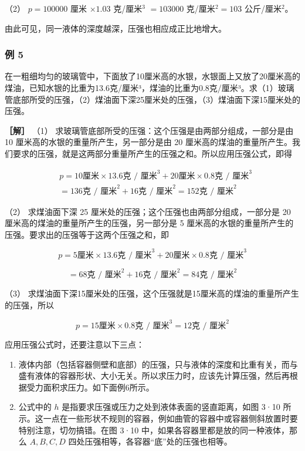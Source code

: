 （2） \(p = 100000\) 厘米 \(\times 1.03\) 克/厘米\(^3\) \(= 103000\)
克/厘米\(^2 = 103\) 公斤/厘米\(^2\)。

由此可见，同一液体的深度越深，压强也相应成正比地增大。

\subsubsection{例 5}\label{ux4f8b-5}

在一粗细均匀的玻璃管中，下面放了10厘米高的水银，水银面上又放了20厘米高的煤油，已知水银的比重为13.6克/厘米³，煤油的比重为0.8克/厘米³。求（1）玻璃管底部所受的压强，（2）煤油面下深25厘米处的压强，（3）煤油面下深15厘米处的压强。

\textbf{［解］} （1）
求玻璃管底部所受的压强：这个压强是由两部分组成，一部分是由 10
厘米高的水银的重量所产生，另一部分是由 20
厘米高的煤油的重量所产生。我们要求的压强，就是这两部分重量所产生的压强之和。所以应用压强公式，即得

\[
\begin{array}{rl} & p = 10 \text{厘米} \times 13.6 \text{克 / 厘米} ^ {3} + 20 \text{厘米} \times 0.8 \text{克 / 厘米} ^ {3} \\ & = 136 \text{克 / 厘米} ^ {2} + 16 \text{克 / 厘米} ^ {2} = 152 \text{克 / 厘米} ^ {2} \end{array}
\]

（2） 求煤油面下深 25 厘米处的压强；这个压强也由两部分组成，一部分是 20
厘米高的煤油的重量所产生的压强，另一部分是 5
厘米高的水银的重量所产生的压强。要求出的压强等于这两个压强之和，即

\[
p = 5 \text{厘米} \times 13.6 \text{克 / 厘米} ^ {3} + 20 \text{厘米} \times 0.8 \text{克 / 厘米} ^ {3}
\]

\[
= 68 \text{克 / 厘米} ^ {2} + 16 \text{克 / 厘米} ^ {2} = 84 \text{克 / 厘米} ^ {2}
\]

（3）
求煤油面下深15厘米处的压强，这个压强就是15厘米高的煤油的重量所产生的压强，所以

\[
p = 15 \text{厘米} \times 0.8 \text{克 / 厘米} ^ {3} = 12 \text{克 / 厘米} ^ {2}
\]

应用压强公式时，还要注意以下三点：

\begin{enumerate}
\def\labelenumi{\arabic{enumi}.}
\item
  液体内部（包括容器侧壁和底部）的压强，只与液体的深度和比重有关，而与盛有液体的容器形状、大小无关。所以求压力时，应该先计算压强，然后再根据受力面积求压力。如下面例6所示。
\item
  公式中的 \(h\) 是指要求压强或压力之处到液体表面的竖直距离，如图 3·10
  所示。这一点在一些形状不规则的容器，例如曲管的容器中或容器侧斜放置时要特别注意，切勿搞错。在图
  3·10 中，如果各容器里都是放的同一种液体，那么 \(A, B, C, D\)
  四处压强相等，各容器``底''处的压强也相等。
\end{enumerate}

